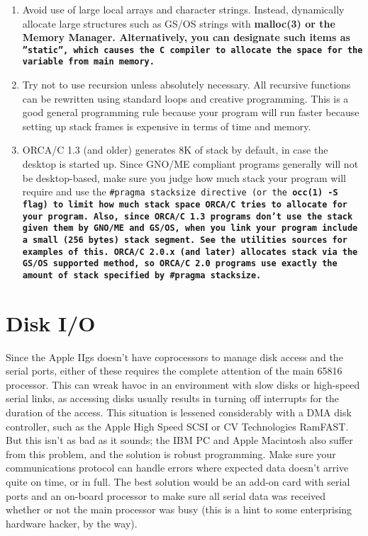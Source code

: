 \documentclass{report}
\begin{document}
\begin{enumerate}
\item
Avoid use of large local arrays and character strings. 
Instead, dynamically allocate large structures such as 
GS/OS strings with  \bf malloc\rm (3) or
the Memory Manager. Alternatively, you can designate such
items as \tt ''static''\rm , which causes the C compiler to
allocate the space for the variable from main memory.


\item
Try not to use recursion unless absolutely necessary. All recursive
functions can be rewritten using standard loops and creative programming.
This is a good general programming rule because your program will run
faster because setting up stack frames is expensive in terms of
time and memory.

\item
ORCA/C 1.3 (and older) generates 8K of
stack by default, in case the desktop is started up.
Since GNO/ME compliant programs generally will not be
desktop-based, make sure you judge how much stack your
program will require and use the \tt \#pragma stacksize \rm directive 
(or the \bf occ\rm (1) \bf -S \rm flag)
to limit how much stack space ORCA/C tries to
allocate for your program. Also, since ORCA/C 1.3 programs
don't use the stack given them by GNO/ME and GS/OS, when
you link your program include a small (256 bytes) stack
segment. See the utilities sources for examples of this.
ORCA/C 2.0.x (and later) allocates stack via the GS/OS supported
method, so ORCA/C 2.0 programs use exactly the amount of
stack specified by \tt \#pragma stacksize\rm .

\end{enumerate}

\section{Disk I/O}

Since the Apple IIgs doesn't have
coprocessors to manage disk access and the serial ports, either
of these requires the complete attention of the main 
65816 processor.
This can wreak havoc in an environment with slow disks
or high-speed serial links, as accessing disks usually results in
turning off interrupts for the duration of the access. This
situation is lessened considerably with a DMA disk controller,
such as the Apple High Speed SCSI or CV Technologies RamFAST. But
this isn't as bad as it sounds; the IBM PC and Apple Macintosh
also suffer from this problem, and the solution is robust
programming. Make sure your communications protocol can handle
errors where expected data doesn't arrive quite on time, or in
full. The best solution would be an add-on card with serial ports
and an on-board processor to make sure all serial data was
received whether or not the main processor was busy (this is a
hint to some enterprising hardware hacker, by the way).
\end{document}
